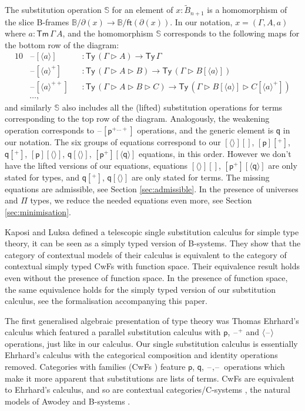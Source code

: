 \documentclass[sigplan,10pt,anonymous,review]{acmart}\settopmatter{printfolios=true,printccs=false,printacmref=false}
\newcommand{\ra}{\rightarrow}
\newcommand{\Ty}{\mathsf{Ty}}
\newcommand{\Tm}{\mathsf{Tm}}
\newcommand{\p}{\mathsf{p}}
\newcommand{\q}{\mathsf{q}}
\newcommand{\ext}{\mathop{\triangleright}}
\newcommand{\blank}{\mathord{\hspace{1pt}\text{--}\hspace{1pt}}} %
\begin{document}
The substitution operation $\mathbb{S}$ for an element of
$x:\tilde{B}_{n+1}$ is a homomorphism of the slice B-frames
$\mathbb{B}/\partial(x) \ra \mathbb{B}/\mathsf{ft}(\partial(x))$. In
our notation, $x = (\Gamma, A, a)$ where $a : \Tm\,\Gamma\,A$, and the
homomorphism $\mathbb{S}$ corresponds to the following maps for the
bottom row of the diagram:
\begin{alignat*}{10}
  & \blank[\langle a\rangle] && : \Ty\,(\Gamma\ext A)\ra\Ty\,\Gamma \\
  & \blank[\langle a\rangle^+] && : \Ty\,(\Gamma\ext A\ext B)\ra\Ty\,(\Gamma\ext B[\langle a\rangle]) \\
  & \blank[\langle a\rangle^{++}] && : \Ty\,(\Gamma\ext A\ext B\ext C)\ra\Ty\,(\Gamma\ext B[\langle a\rangle]\ext C[\langle a\rangle^+]) \\
  & \dots,
\end{alignat*}
and similarly $\mathbb{S}$ also includes all the (lifted) substitution
operations for terms corresponding to the top row of the
diagram. Analogously, the weakening operation corresponds to
$\blank[\p^{+\dots+}]$ operations, and the generic element is $\q$ in
our notation. The six groups of equations correspond to our
$[\langle\rangle][]$, $[\p][^+]$, $\q[^+]$, $[\p][\langle\rangle]$,
$\q[\langle\rangle]$, $[\p^+][\langle\q\rangle]$ equations, in this
order. However we don't have the lifted versions of our equations,
equations $[\langle\rangle][]$, $[\p^+][\langle\q\rangle]$ are only
stated for types, and $\q[^+]$, $\q[\langle\rangle]$ are only stated
for terms. The missing equations are admissible, see Section
\ref{sec:admissible}. In the presence of universes and $\Pi$ types, we
reduce the needed equations even more, see Section
\ref{sec:minimisation}.

Kaposi and Luksa \cite{luksa} defined a telescopic single substitution
calculus for simple type theory, it can be seen as a simply typed
version of B-systems. They show that the category of contextual models
of their calculus is equivalent to the category of contextual simply
typed CwFs with function space. Their equivalence result holds even
without the presence of function space. In the presence of function
space, the same equivalence holds for the simply typed version of our
substitution calculus, see the formalisation accompanying this paper.

The first generalised algebraic presentation of type theory was Thomas
Ehrhard's calculus \cite{ehrhard,coquandEhrhard} which featured a
parallel substitution calculus with $\p$, $\blank^+$ and
$\langle\blank\rangle$ operations, just like in our calculus. Our
single substitution calculus is essentially Ehrhard's calculus with
the categorical composition and identity operations
removed. Categories with families (CwFs
\cite{DBLP:conf/types/Dybjer95,Castellan2021}) feature $\p$, $\q$,
$\blank,\blank$ operations which make it more apparent that
substitutions are lists of terms. CwFs are equivalent to Ehrhard's
calculus, and so are contextual categories/C-systems
\cite{DBLP:journals/apal/Cartmell86,DBLP:journals/lmcs/AhrensLV18},
the natural models of Awodey \cite{DBLP:journals/mscs/Awodey18} and
B-systems \cite{AHRENS_EMMENEGGER_NORTH_RIJKE_2023}.
\end{document}
